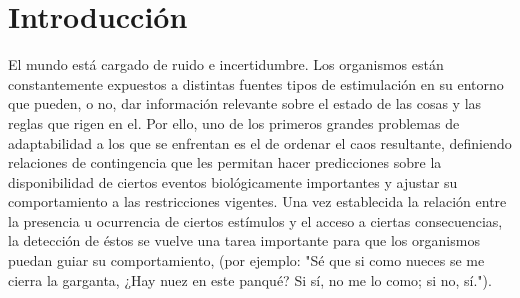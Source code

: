 
\chapter{Introducción} %

\label{Chapter1} %


\newcommand{\keyword}[1]{\textbf{#1}}
\newcommand{\tabhead}[1]{\textbf{#1}}
\newcommand{\code}[1]{\texttt{#1}}
\newcommand{\file}[1]{\texttt{\bfseries#1}}
\newcommand{\option}[1]{\texttt{\itshape#1}}


El mundo está cargado de ruido e incertidumbre. Los organismos están constantemente expuestos a distintas fuentes tipos de estimulación en su entorno que pueden, o no, dar información relevante sobre el estado de las cosas y las reglas que rigen en el. Por ello, uno de los primeros grandes problemas de adaptabilidad a los que se enfrentan es el de ordenar el caos resultante, definiendo relaciones de contingencia que les permitan hacer predicciones sobre la disponibilidad de ciertos eventos biológicamente importantes y ajustar su comportamiento a las restricciones vigentes. Una vez establecida la relación entre la presencia u ocurrencia de ciertos estímulos y el acceso a ciertas consecuencias, la detección de éstos se vuelve una tarea importante para que los organismos puedan guiar su comportamiento, (por ejemplo: "Sé que si como nueces se me cierra la garganta, ¿Hay nuez en este panqué? Si sí, no me lo como; si no, sí.").\\

